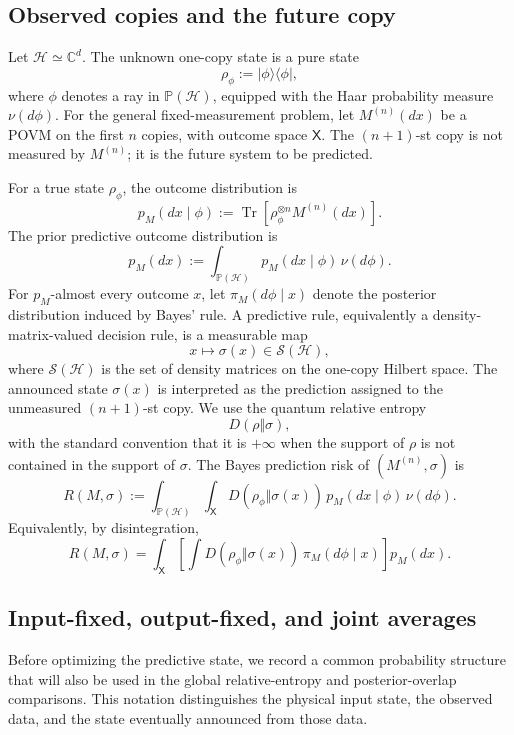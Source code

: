 \documentclass[journal]{IEEEtran}
\newcommand{\ket}[1]{\lvert #1\rangle}
\newcommand{\bra}[1]{\langle #1\rvert}
\begin{document}
\subsection{Observed copies and the future copy}
\label{subsec:general_model}
Let \(\mathcal H\simeq\mathbb C^d\).  The unknown one-copy state is a pure state
\[
    \rho_\phi:=\ket{\phi}\bra{\phi},
\]
where \(\phi\) denotes a ray in \(\mathbb P(\mathcal H)\), equipped with the Haar
probability measure \(\nu(d\phi)\).  For the general fixed-measurement problem,
let \(M^{(n)}(dx)\) be a POVM on the first \(n\) copies, with outcome space
\(\mathsf X\).  The \((n+1)\)-st copy is not measured by \(M^{(n)}\); it is the
future system to be predicted.

For a true state \(\rho_\phi\), the outcome distribution is
\[
    p_M(dx\mid\phi)
    :=
    \operatorname{Tr}\!\left[\rho_\phi^{\otimes n}M^{(n)}(dx)\right].
\]
The prior predictive outcome distribution is
\[
    p_M(dx)
    :=
    \int_{\mathbb P(\mathcal H)}p_M(dx\mid\phi)\,\nu(d\phi).
\]
For \(p_M\)-almost every outcome \(x\), let \(\pi_M(d\phi\mid x)\) denote the
posterior distribution induced by Bayes' rule.  A predictive rule, equivalently
a density-matrix-valued decision rule, is a measurable map
\[
    x\longmapsto \sigma(x)\in\mathcal S(\mathcal H),
\]
where \(\mathcal S(\mathcal H)\) is the set of density matrices on the one-copy
Hilbert space.  The announced state \(\sigma(x)\) is interpreted as the
prediction assigned to the unmeasured \((n+1)\)-st copy.  We use the quantum
relative entropy~\cite{umegaki1962}
\[
    D(\rho\Vert\sigma),
\]
with the standard convention that it is \(+\infty\) when the support of \(\rho\)
is not contained in the support of \(\sigma\).  The Bayes prediction risk of
\((M^{(n)},\sigma)\) is
\[
    R(M,\sigma)
    :=
    \int_{\mathbb P(\mathcal H)}\int_{\mathsf X}
    D(\rho_\phi\Vert\sigma(x))\,
    p_M(dx\mid\phi)\,\nu(d\phi).
\]
Equivalently, by disintegration,
\[
    R(M,\sigma)
    =
    \int_{\mathsf X}
    \left[
        \int D(\rho_\phi\Vert\sigma(x))\,
        \pi_M(d\phi\mid x)
    \right]
    p_M(dx).
\]

\subsection{Input-fixed, output-fixed, and joint averages}
\label{subsec:input_output_joint_averages}

Before optimizing the predictive state, we record a common probability
structure that will also be used in the global relative-entropy and posterior-overlap comparisons.  This notation distinguishes the physical input state, the
observed data, and the state eventually announced from those data.
\end{document}
